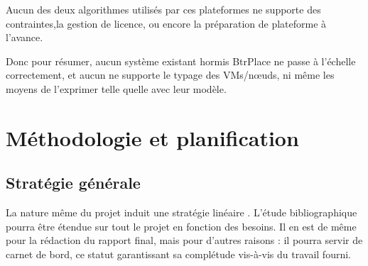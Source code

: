 \documentclass[a4paper]{article}
\begin{document}
Aucun des deux algorithmes utilisés par ces plateformes
ne supporte des contraintes,la gestion de licence, ou encore la
préparation de plateforme à l'avance.

Donc pour résumer, aucun système existant hormis BtrPlace ne passe
à l'échelle correctement, et aucun ne supporte le typage des VMs/nœuds,
ni même les moyens de l'exprimer telle quelle avec leur modèle.

\section{Méthodologie et planification}
\subsection{Stratégie générale}
La nature même du projet induit une stratégie \og linéaire \fg. L'étude
bibliographique pourra être étendue sur tout le projet en fonction
des besoins. Il en est de même pour la rédaction du rapport final, mais
pour d'autres raisons : il pourra servir de carnet de bord, ce
statut garantissant sa complétude vis-à-vis du travail fourni.
\end{document}
